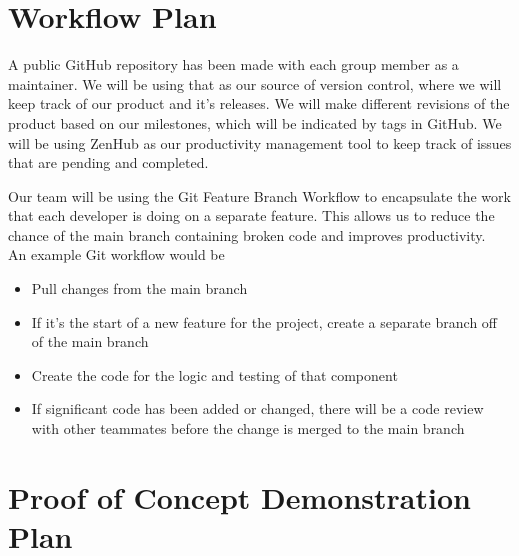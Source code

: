 \documentclass{article}
\begin{document}
\section{Workflow Plan}

A public GitHub repository has been made with each group member as a maintainer. We will be using that as our source of version control, where we will keep track of our product and it's releases. We will make different revisions of the product based on our milestones, which will be indicated by tags in GitHub. We will be using ZenHub as our productivity management tool to keep track of issues that are pending and completed. 

Our team will be using the Git Feature Branch Workflow to encapsulate the work that each developer is doing on a separate feature. This allows us to reduce the chance of the main branch containing broken code and improves productivity.\\

An example Git workflow would be 
\begin{itemize}
    \item Pull changes from the main branch
    \item If it's the start of a new feature for the project, create a separate branch off of the main branch
    \item Create the code for the logic and testing of that component
    \item If significant code has been added or changed, there will be a code review with other teammates before the change is merged to the main branch
\end{itemize}

\section{Proof of Concept Demonstration Plan}
\end{document}
